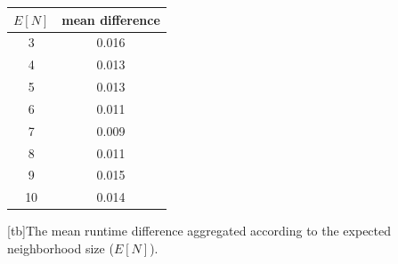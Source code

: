 \documentclass[letterpaper]{article}
\theoremstyle{definition}
\theoremstyle{remark}
\begin{document}
\begin{center}
\begin{tabular}{ |c|c| } 
 \hline
 $E[N]$ 		& 	mean difference \\ \hline 
3	& 	0.016  \\	\hline
4	& 	0.013 \\\hline
5	& 	0.013 \\\hline
6	& 	0.011 	\\		\hline 
7	& 	0.009 \\\hline
8	&	0.011 	\\\hline
9	&	0.015 	\\\hline
10	& 	0.014\\
 \hline
\end{tabular}
[tb]{The mean runtime difference aggregated according to the expected neighborhood size ($E[N]$).}
\label{table:meanrunen}
\end{center} 	
 



\vskip 0.2in


\end{document}
